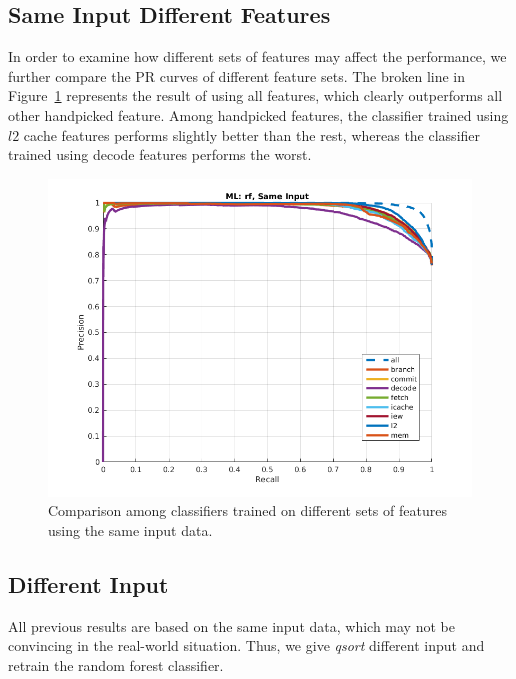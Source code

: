 \subsection{Same Input Different Features}
In order to examine how different sets of features may affect the performance, we further compare the PR curves of different feature sets. The broken line in Figure~\ref{fig:sidf} represents the result of using all features, which clearly outperforms all other handpicked feature. Among handpicked features, the classifier trained using $l2$ cache features performs slightly better than the rest, whereas the classifier trained using decode features performs the worst.

\begin{figure}[t]
\begin{center}
   \includegraphics[width=0.95\linewidth]{./figures/sidf.png}
\end{center}
   \caption{Comparison among classifiers trained on different sets of features using the same input data.}
\label{fig:sidf}
\end{figure}

\subsection{Different Input}
All previous results are based on the same input data, which may not be convincing in the real-world situation. Thus, we give \emph{qsort} different input and retrain the random forest classifier.

